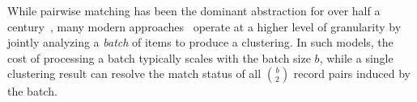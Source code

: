 \documentclass[sigconf, nonacm]{acmart}
\begin{document}
While pairwise matching has been the dominant abstraction for over half a century~\cite{fellegi1969theory}, many modern approaches~\cite{DBLP:conf/icml/LeeLKKCT19, DBLP:conf/coling/WangCLCHSWZ25, crowder, DBLP:conf/cvpr/SchroffKP15} operate at a higher level of granularity by jointly analyzing a \emph{batch} of items to produce a clustering.
In such models, the cost of processing a batch typically scales with the batch size $b$, while a single clustering result can resolve the match status of all $\binom{b}{2}$ record pairs induced by the batch.
\end{document}
